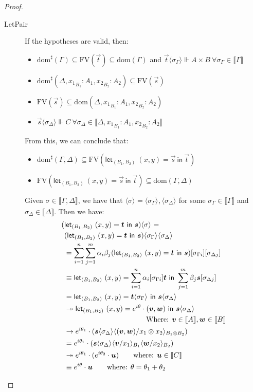 \documentclass[runningheads,orivec]{llncs}
\newcommand\ansubst[2]{\ensuremath{\langle #1 \rangle_{#2}}}
\newcommand\dom[1]{\mathrm{dom}(#1)}
\newcommand\sdom[1]{\mathrm{dom}^{\sharp}(#1)}
\newcommand\FV[1]{\mathrm{FV}(#1)}
\def\Pair#1#2{(#1,#2)} %
\def\letkeyword{\mathsf{let}}
\def\inkeyword{\mathsf{in}}
\def\LetP#1#2#3#4#5#6{\letkeyword_{\Pair{#2}{#4}}~\Pair{#1}{#3}=#5~\inkeyword~#6}
\def\evalone{\rightarrow}
\def\eval{\twoheadrightarrow}
\def\sem#1{\llbracket#1\rrbracket}
\begin{document}
\begin{proof}
\begin{description}
    \item[LetPair] If the hypotheses are valid, then:
    \begin{itemize}
        \item $\sdom{\Gamma}\subseteq \FV{\vec t} \subseteq \dom{\Gamma}$ and $\vec t \ansubst{\sigma_\Gamma}{}\Vdash A\times B\ \forall \sigma_\Gamma\in\sem\Gamma$
        \item $\sdom{\Delta, {x_1}_{B_1}:A_1, {x_2}_{B_2}:A_2}\subseteq\FV{\vec s}$
        \item $\FV{\vec{s}}\subseteq \dom{\Delta,{x_1}_{B_1}:A_1, {x_2}_{B_2}:A_2}$
        \item $\vec s \ansubst{\sigma_\Delta}{}\Vdash C\ \forall \sigma_\Delta\in\sem{\Delta, {x_1}_{B_1}:A_1, {x_2}_{B_2}:A_2}$
    \end{itemize}
    From this, we can conclude that:
    \begin{itemize}
        \item $\sdom{\Gamma,\Delta}\subseteq\FV{\LetP{x}{B_1}{y}{B_2}{\vec{s}}{\vec{t}}}$
        \item $\FV{\LetP{x}{B_1}{y}{B_2}{\vec{s}}{\vec{t}}}\subseteq\dom{\Gamma,\Delta}$
    \end{itemize}
    
    Given $\sigma\in\sem{\Gamma,\Delta}$, we have that $\ansubst{\sigma}{}=\ansubst{\sigma_\Gamma}{},\ansubst{\sigma_\Delta}{}$ for some $\sigma_\Gamma\in\sem\Gamma$ and $\sigma_\Delta\in\sem\Delta$. Then we have:
    \begin{align*}
        (&\LetP{x}{B_1}{y}{B_2}{\vec{t}}{\vec{s}})\ansubst{\sigma}{} = \\
        &(\LetP{x}{B_1}{y}{B_2}{\vec{t}}{\vec{s}})\ansubst{\sigma_\Gamma}{}\ansubst{\sigma_\Delta}{}\\
        &= \sum_{i=1}^{n}\sum_{j=1}^{m}\alpha_i\beta_j(\LetP{x}{B_1}{y}{B_2}{\vec{t}}{\vec{s}})[\sigma_{\Gamma i}][\sigma_{\Delta j}]\\
        &\equiv \LetP{x}{B_1}{y}{B_2}{\sum_{i=1}^{n}\alpha_i[\sigma_{\Gamma i}]\vec{t}}{\sum_{j=1}^{m}\beta_j \vec{s}[\sigma_{\Delta j}]}\\
        &= \LetP{x}{B_1}{y}{B_2}{\vec{t}\ansubst{\sigma_\Gamma}{}}{\vec{s}\ansubst{\sigma_\Delta}{}}\\
        &\eval \LetP{x}{B_1}{y}{B_2}{e^{i\theta}\cdot\Pair{\vec{v}}{\vec{w}}}{\vec{s}\ansubst{\sigma_\Delta}{}}\\
        &\hspace*{4cm}{\text{Where: }}\vec{v}\in\sem{A},\vec{w}\in\sem{B}\\
        &\evalone e^{i\theta_1}\cdot(\vec{s}\ansubst{\sigma_\Delta}{}\ansubst{\Pair{\vec{v}}{\vec{w}}/x_1\otimes x_2}{B_1\otimes B_2})\\
        &= e^{i\theta_1}\cdot(\vec{s}\ansubst{\sigma_\Delta}{}\ansubst{\vec{v}/x_1}{B_1}\ansubst{\vec{w}/x_2}{B_2})\\
        &\eval e^{i\theta_1}\cdot (e^{i\theta_2}\cdot \vec{u})\qquad\text{where: }\vec{u}\in\sem{C}\\
        &\equiv e^{i\theta}\cdot \vec{u}\qquad\text{where: }\theta=\theta_1 + \theta_2
    \end{align*}
    

\end{description}
\end{proof}
\end{document}
